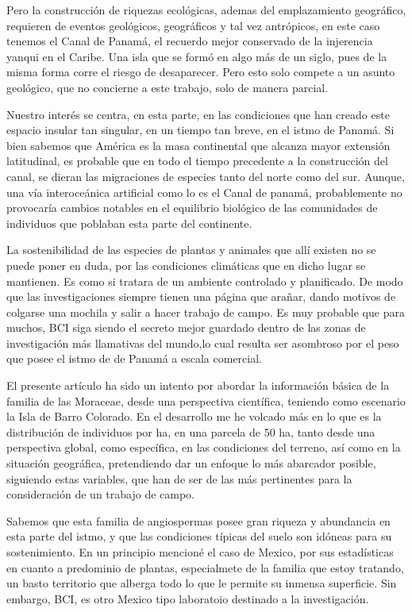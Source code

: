 \documentclass[11pt,]{article}
\begin{document}
Pero la construcción de riquezas ecológicas, ademas del emplazamiento
geográfico, requieren de eventos geológicos, geográficos y tal vez
antrópicos, en este caso tenemos el Canal de Panamá, el recuerdo mejor
conservado de la injerencia yanqui en el Caribe. Una isla que se formó
en algo más de un siglo, pues de la misma forma corre el riesgo de
desaparecer. Pero esto solo compete a un asunto geológico, que no
concierne a este trabajo, solo de manera parcial.

Nuestro interés se centra, en esta parte, en las condiciones que han
creado este espacio insular tan singular, en un tiempo tan breve, en el
istmo de Panamá. Si bien sabemos que América es la masa continental que
alcanza mayor extensión latitudinal, es probable que en todo el tiempo
precedente a la construcción del canal, se dieran las migraciones de
especies tanto del norte como del sur. Aunque, una vía interoceánica
artificial como lo es el Canal de panamá, probablemente no provocaría
cambios notables en el equilibrio biológico de las comunidades de
individuos que poblaban esta parte del continente.

La sostenibilidad de las especies de plantas y animales que allí existen
no se puede poner en duda, por las condiciones climáticas que en dicho
lugar se mantienen. Es como si tratara de un ambiente controlado y
planificado. De modo que las investigaciones siempre tienen una página
que arañar, dando motivos de colgarse una mochila y salir a hacer
trabajo de campo. Es muy probable que para muchos, BCI siga siendo el
secreto mejor guardado dentro de las zonas de investigación más
llamativas del mundo,lo cual resulta ser asombroso por el peso que posee
el istmo de de Panamá a escala comercial.

El presente artículo ha sido un intento por abordar la información
básica de la familia de las Moraceae, desde una perspectiva científica,
teniendo como escenario la Isla de Barro Colorado. En el desarrollo me
he volcado más en lo que es la distribución de individuos por ha, en una
parcela de 50 ha, tanto desde una perspectiva global, como específica,
en las condiciones del terreno, así como en la situación geográfica,
pretendiendo dar un enfoque lo más abarcador posible, siguiendo estas
variables, que han de ser de las más pertinentes para la consideración
de un trabajo de campo.

Sabemos que esta familia de angiospermas posee gran riqueza y abundancia
en esta parte del istmo, y que las condiciones típicas del suelo son
idóneas para su sostenimiento. En un principio mencioné el caso de
Mexico, por sus estadísticas en cuanto a predominio de plantas,
especialmete de la familia que estoy tratando, un basto territorio que
alberga todo lo que le permite su inmensa superficie. Sin embargo, BCI,
es otro Mexico tipo laboratoio destinado a la investigación.
\end{document}
